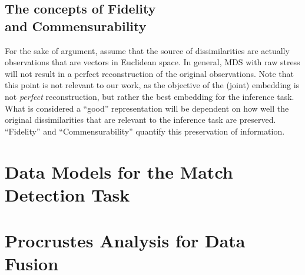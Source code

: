 \documentclass[12pt,oneside,final]{thesis}\usepackage[]{graphicx}\usepackage[]{color}
\begin{document}
\section[The concepts of  Fidelity and Commensurability]{The concepts of  Fidelity\\ and Commensurability\label{sec:FidComm_intro}}

For the sake of argument, assume that the source of dissimilarities  are actually observations that are vectors in  Euclidean space. In general, MDS with raw stress will not result in a perfect reconstruction  of the original observations.
 Note that this point is not relevant to our work, as  the objective of the (joint) embedding is not \emph{perfect} reconstruction, but rather the best embedding for the inference task. What is considered a ``good''  representation will be dependent on how well the original dissimilarities that are relevant to the inference task are preserved. ``Fidelity'' and ``Commensurability'' quantify this preservation of information.


\chapter{Data Models for the Match Detection Task}
\label{chap:data_models}






\chapter{Procrustes Analysis for Data Fusion}
\label{chap:PoM}
\end{document}
